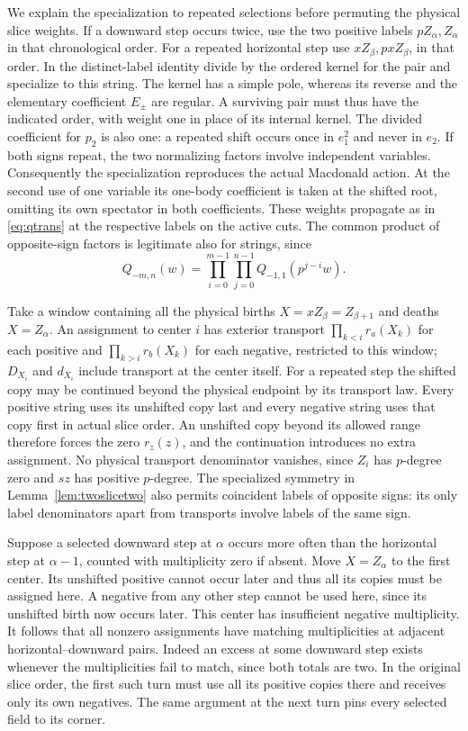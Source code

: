 We explain the specialization to repeated selections before permuting
the physical slice weights. If a downward step occurs twice, use the
two positive labels $pZ_\alpha,Z_\alpha$ in that chronological order.
For a repeated horizontal step use $xZ_\beta,pxZ_\beta$, in that
order. In the distinct-label identity divide by the ordered kernel for
the pair and specialize to this string. The kernel has a simple pole,
whereas its reverse and the elementary coefficient $E_\pm$ are
regular. A surviving pair must thus have the indicated order, with
weight one in place of its internal kernel. The divided coefficient
for $p_2$ is also one: a repeated shift occurs once in $e_1^2$ and
never in $e_2$. If both signs repeat, the two normalizing factors
involve independent variables. Consequently the specialization
reproduces the actual Macdonald action. At the second use of one
variable its one-body coefficient is taken at the shifted root,
omitting its own spectator in both coefficients. These weights propagate
as in \eqref{eq:qtrans} at the respective labels on the active cuts.
The common product of opposite-sign factors is legitimate also for
strings, since
\[
     Q_{-m,n}(w)=\prod_{i=0}^{m-1}\prod_{j=0}^{n-1}
                       Q_{-1,1}(p^{j-i}w).
\]

Take a window containing all the physical births $X=xZ_\beta=Z_{\beta+1}$
and deaths $X=Z_\alpha$. An assignment to center $i$ has exterior
transport $\prod_{k<i}r_a(X_k)$ for each positive and
$\prod_{k>i}r_b(X_k)$ for each negative, restricted to this window;
$D_{X_i}$ and $d_{X_i}$ include transport at the center itself.
For a repeated step the shifted copy may be continued beyond the
physical endpoint by its transport law. Every positive string uses
its unshifted copy last and every negative string uses that copy first
in actual slice order. An unshifted copy beyond its allowed range
therefore forces the zero $r_z(z)$, and the continuation introduces
no extra assignment. No physical transport denominator vanishes,
since $Z_i$ has $p$-degree zero and $sz$ has positive $p$-degree.
The specialized symmetry in Lemma~\ref{lem:twoslicetwo} also permits
coincident labels of opposite signs: its only label denominators
apart from transports involve labels of the same sign.

Suppose a selected downward step at $\alpha$ occurs more often than
the horizontal step at $\alpha-1$, counted with multiplicity zero if
absent. Move $X=Z_\alpha$ to the first center. Its unshifted positive
cannot occur later and thus all its copies must be assigned here.
A negative from any other step cannot be used here, since its
unshifted birth now occurs later. This center has insufficient negative
multiplicity. It follows that all nonzero assignments have matching
multiplicities at adjacent horizontal--downward pairs. Indeed an
excess at some downward step exists whenever the multiplicities fail
to match, since both totals are two. In the original slice order,
the first such turn must use all its positive copies there and receives
only its own negatives. The same argument at the next turn pins every
selected field to its corner.

